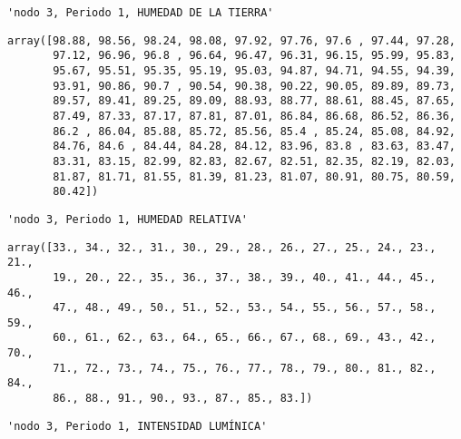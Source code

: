 \documentclass[11pt]{article}
\begin{document}
    \begin{verbatim}
'nodo 3, Periodo 1, HUMEDAD DE LA TIERRA'
    \end{verbatim}

    
    
    \begin{verbatim}
array([98.88, 98.56, 98.24, 98.08, 97.92, 97.76, 97.6 , 97.44, 97.28,
       97.12, 96.96, 96.8 , 96.64, 96.47, 96.31, 96.15, 95.99, 95.83,
       95.67, 95.51, 95.35, 95.19, 95.03, 94.87, 94.71, 94.55, 94.39,
       93.91, 90.86, 90.7 , 90.54, 90.38, 90.22, 90.05, 89.89, 89.73,
       89.57, 89.41, 89.25, 89.09, 88.93, 88.77, 88.61, 88.45, 87.65,
       87.49, 87.33, 87.17, 87.81, 87.01, 86.84, 86.68, 86.52, 86.36,
       86.2 , 86.04, 85.88, 85.72, 85.56, 85.4 , 85.24, 85.08, 84.92,
       84.76, 84.6 , 84.44, 84.28, 84.12, 83.96, 83.8 , 83.63, 83.47,
       83.31, 83.15, 82.99, 82.83, 82.67, 82.51, 82.35, 82.19, 82.03,
       81.87, 81.71, 81.55, 81.39, 81.23, 81.07, 80.91, 80.75, 80.59,
       80.42])
    \end{verbatim}

    
    
    \begin{verbatim}
'nodo 3, Periodo 1, HUMEDAD RELATIVA'
    \end{verbatim}

    
    
    \begin{verbatim}
array([33., 34., 32., 31., 30., 29., 28., 26., 27., 25., 24., 23., 21.,
       19., 20., 22., 35., 36., 37., 38., 39., 40., 41., 44., 45., 46.,
       47., 48., 49., 50., 51., 52., 53., 54., 55., 56., 57., 58., 59.,
       60., 61., 62., 63., 64., 65., 66., 67., 68., 69., 43., 42., 70.,
       71., 72., 73., 74., 75., 76., 77., 78., 79., 80., 81., 82., 84.,
       86., 88., 91., 90., 93., 87., 85., 83.])
    \end{verbatim}

    
    
    \begin{verbatim}
'nodo 3, Periodo 1, INTENSIDAD LUMÍNICA'
    \end{verbatim}

    
    
\end{document}
